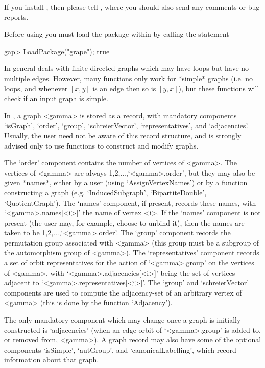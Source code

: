 If you install {\GRAPE}, then please tell ,
where you should also send any comments or bug reports.


Before using {\GRAPE} you must load the package within {\GAP} by calling 
the statement

\begintt
gap> LoadPackage("grape");
true
\endtt

 
In general {\GRAPE} deals with finite directed graphs which may have
loops but have no multiple edges. However, many {\GRAPE} functions only
work for *simple* graphs (i.e. no loops, and whenever $[x,y]$ is an
edge then so is $[y,x]$), but these functions will check if an input
graph is simple.

In {\GRAPE}, a graph <gamma> is stored as a record, with mandatory
components `isGraph', `order', `group', `schreierVector',
`representatives', and `adjacencies'. Usually, the user need not be
aware of this record structure, and is strongly advised only to use
{\GRAPE} functions to construct and modify graphs.

The `order' component contains the number of vertices of <gamma>. The
vertices of <gamma> are always 1,2,...,`<gamma>.order', but they may also
be given *names*, either by a user (using `AssignVertexNames') or by a
function constructing a graph (e.g. `InducedSubgraph', `BipartiteDouble',
`QuotientGraph'). The `names' component, if present, records these
names, with `<gamma>.names[<i>]' the name of vertex <i>.  If the `names'
component is not present (the user may, for example, choose to unbind
it), then the names are taken to be 1,2,...,`<gamma>.order'. The `group'
component records the {\GAP} permutation group associated with <gamma>
(this group must be a subgroup of the automorphism group of <gamma>). The
`representatives' component records a set of orbit representatives
for the action of `<gamma>.group' on the vertices of <gamma>, with
`<gamma>.adjacencies[<i>]' being the set of vertices adjacent to
`<gamma>.representatives[<i>]'. The `group' and `schreierVector'
components are used to compute the adjacency-set of an arbitrary vertex
of <gamma> (this is done by the function `Adjacency').

The only mandatory component which may change once a graph is initially
constructed is `adjacencies' (when an edge-orbit of `<gamma>.group' is
added to, or removed from, <gamma>). A graph record may also have some
of the optional components `isSimple', `autGroup', and
`canonicalLabelling', which record information about that graph.

